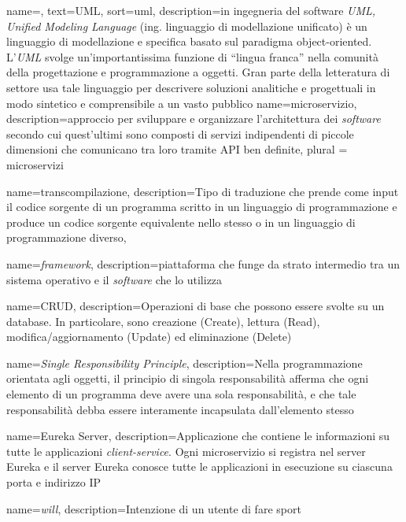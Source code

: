 {
    name=,
    text=UML,
    sort=uml,
    description={in ingegneria del software \emph{UML, Unified Modeling Language} (ing. linguaggio di modellazione unificato) è un linguaggio di modellazione e specifica basato sul paradigma object-oriented. L'\emph{UML} svolge un'importantissima funzione di ``lingua franca'' nella comunità della progettazione e programmazione a oggetti. Gran parte della letteratura di settore usa tale linguaggio per descrivere soluzioni analitiche e progettuali in modo sintetico e comprensibile a un vasto pubblico}
}
{
    name={microservizio},
    description={approccio per sviluppare e organizzare l’architettura dei \textit{software} secondo cui quest’ultimi sono composti di servizi indipendenti di piccole dimensioni che comunicano tra loro tramite \gls{API} ben definite},
    plural = {microservizi}
}

{
    name={transcompilazione},
    description={Tipo di traduzione 
    che prende come input il codice sorgente di un programma scritto in un linguaggio di programmazione e produce un codice sorgente equivalente nello stesso o in un linguaggio di programmazione diverso},
}


{
    name={\textit{framework}},
    description={piattaforma che funge da strato intermedio tra un sistema operativo e il \textit{software} che lo utilizza}
}


{
    name={CRUD},
    description={Operazioni di base che possono essere svolte su un database. In particolare,
    sono creazione (Create), lettura (Read), modifica/aggiornamento (Update) ed
    eliminazione (Delete)}
}


{
    name=\textit{Single Responsibility Principle},
    description={Nella programmazione orientata agli oggetti, il principio di singola responsabilità afferma che ogni elemento di un programma deve avere una sola responsabilità, e che tale responsabilità debba essere interamente incapsulata dall'elemento stesso}
}

{
    name={Eureka Server},
    description={Applicazione che contiene le informazioni su tutte le applicazioni \textit{client-service}. Ogni \gls{microservizio} si registra nel server Eureka e il server Eureka conosce tutte le applicazioni in esecuzione su ciascuna porta e indirizzo \gls{IP}}
}


{
    name={\textit{will}},
    description={Intenzione di un utente di fare sport}
}


